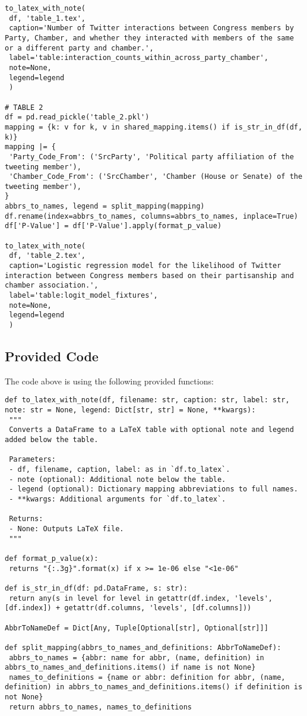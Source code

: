 \documentclass[11pt]{article}
\begin{document}
\begin{verbatim}
to_latex_with_note(
 df, 'table_1.tex',
 caption='Number of Twitter interactions between Congress members by Party, Chamber, and whether they interacted with members of the same or a different party and chamber.',
 label='table:interaction_counts_within_across_party_chamber',
 note=None,
 legend=legend
 )

# TABLE 2
df = pd.read_pickle('table_2.pkl')
mapping = {k: v for k, v in shared_mapping.items() if is_str_in_df(df, k)} 
mapping |= {
 'Party_Code_From': ('SrcParty', 'Political party affiliation of the tweeting member'),
 'Chamber_Code_From': ('SrcChamber', 'Chamber (House or Senate) of the tweeting member'),
}
abbrs_to_names, legend = split_mapping(mapping)
df.rename(index=abbrs_to_names, columns=abbrs_to_names, inplace=True)
df['P-Value'] = df['P-Value'].apply(format_p_value)

to_latex_with_note(
 df, 'table_2.tex',
 caption='Logistic regression model for the likelihood of Twitter interaction between Congress members based on their partisanship and chamber association.',
 label='table:logit_model_fixtures',
 note=None,
 legend=legend
 )

\end{verbatim}

\subsection{Provided Code}
The code above is using the following provided functions:

\begin{verbatim}
def to_latex_with_note(df, filename: str, caption: str, label: str, note: str = None, legend: Dict[str, str] = None, **kwargs):
 """
 Converts a DataFrame to a LaTeX table with optional note and legend added below the table.

 Parameters:
 - df, filename, caption, label: as in `df.to_latex`.
 - note (optional): Additional note below the table.
 - legend (optional): Dictionary mapping abbreviations to full names.
 - **kwargs: Additional arguments for `df.to_latex`.

 Returns:
 - None: Outputs LaTeX file.
 """

def format_p_value(x):
 returns "{:.3g}".format(x) if x >= 1e-06 else "<1e-06"

def is_str_in_df(df: pd.DataFrame, s: str):
 return any(s in level for level in getattr(df.index, 'levels', [df.index]) + getattr(df.columns, 'levels', [df.columns]))

AbbrToNameDef = Dict[Any, Tuple[Optional[str], Optional[str]]]

def split_mapping(abbrs_to_names_and_definitions: AbbrToNameDef):
 abbrs_to_names = {abbr: name for abbr, (name, definition) in abbrs_to_names_and_definitions.items() if name is not None}
 names_to_definitions = {name or abbr: definition for abbr, (name, definition) in abbrs_to_names_and_definitions.items() if definition is not None}
 return abbrs_to_names, names_to_definitions

\end{verbatim}
\end{document}
